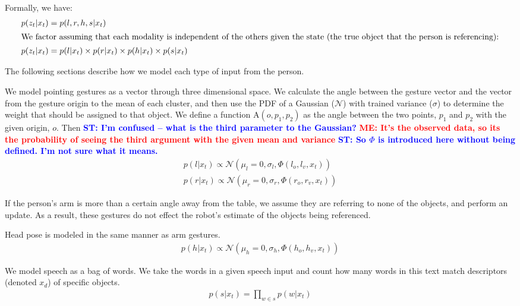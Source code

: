 \documentclass[letterpaper, 10 pt, conference]{ieeeconf}
\newcommand{\stnote}[1]{\textcolor{Blue}{\textbf{ST: #1}}}
\newcommand{\menote}[1]{\textcolor{Red}{\textbf{ME: #1}}}
\begin{document}
Formally, we have:
\begin{align}
p(z_t | x_t) &= p(l, r, h, s | x_t)\\
\intertext{We factor assuming that each modality is independent of the others given the state (the true object that the person is referencing):}
p(z_t | x_t) &= p(l | x_t) \times p(r | x_t) \times p(h | x_t) \times p(s | x_t)
\end{align}

\noindent The following sections describe how we model each type of
input from the person.

  We model pointing gestures as a vector
through three dimensional space. We calculate the angle between the
gesture vector and the vector from the gesture origin to the mean of
each cluster, and then use the PDF of a Gaussian ($\mathcal{N}$) with
trained variance ($\sigma$) to determine the weight that should be
assigned to that object. We define a function $\mbox{A}(o, p_1, p_2)$ as the
angle between the two points, $p_1$ and $p_2$ with the given origin,
$o$.  Then 
\stnote{I'm confused -- what is the third parameter to the Gaussian?}
\menote{It's the observed data, so its the probability of seeing the third argument with the given mean and variance}
\stnote{So $\Phi$ is introduced here without being defined.  I'm not sure what it means.}
\begin{align}
p(l | x_t) \propto \mathcal{N}(\mu_l=0, \sigma_l,\Phi(l_o, l_v, x_t))\\
p(r | x_t) \propto \mathcal{N}(\mu_r=0, \sigma_r,\Phi(r_o, r_v, x_t))
\end{align}

If the person's arm is more than a certain angle away from the table,
we assume they are referring to none of the objects, and perform an
update.  As a result, these gestures do not effect the robot's
estimate of the objects being referenced.

Head pose is modeled in the same manner as arm gestures.
\begin{align}
p(h | x_t) \propto \mathcal{N}(\mu_h=0, \sigma_h,\Phi(h_o, h_v, x_t))
\end{align}


  We model speech as a bag of words. We
take the words in a given speech input and count how many words in
this text match descriptors (denoted $x_d$) of specific objects.
\begin{align}
p(s |x_t) = \displaystyle \prod_{w \in s} p(w | x_t)
\end{align}
\end{document}
